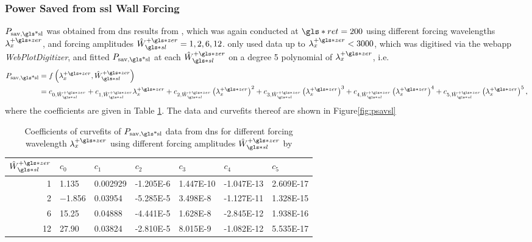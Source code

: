 \subsubsection{Power Saved from \gls{ssl} Wall Forcing}
$P_\text{sav,\gls*{sl}} $ was obtained from \gls{dns} results from \textcite{viotti2009}, which was again conducted at $\gls*{ret}=200$ using different forcing wavelengths $\lambda_x\pz$, and forcing amplitudes $\hat{W}\pz\ssl=1,2,6,12$. \textcite{chernyshenko2013} only used data up to $\lambda_x\pz<3000$, which was digitised via the webapp \textit{WebPlotDigitizer}, and fitted $P_\text{sav,\gls*{sl}}$ at each $\hat{W}\pz\ssl$ on a degree 5 polynomial of $\lambda_x\pz$, i.e.
\begin{align}
	P_\text{sav,\gls*{sl}} &= f\left(\lambda_x\pz,\hat{W}\pz\ssl\right)\\
			       &= c_{0,\hat{W}\pz\ssl} + c_{1,\hat{W}\pz\ssl}\lambda_x\pz+c_{2,\hat{W}\pz\ssl}\left(\lambda_x\pz\right)^{2}+c_{3,\hat{W}\pz\ssl}\left(\lambda_x\pz\right)^{3}+c_{4,\hat{W}\pz\ssl}\left(\lambda_x\pz\right)^{4}+c_{5,\hat{W}\pz\ssl}\left(\lambda_x\pz\right)^{5}\label{eq:psavsl}
,\end{align}
where the coefficients are given in Table \ref{tab:psavslcoeff}. The data and curvefits thereof are shown in Figure\ref{fig:psavsl}
\begin{table}[htbp]
	\centering
	\begin{tabular}{r|llllll}
		$\hat{W}\pz\ssl$ & $c_0$ & $c_1$ & $c_2$ & $c_3$ & $c_4$ & $c_5$\\
		\hline
		1 & \num{1.135} &  \num{0.002929} &  \num{-1.205E-6} &  \num{1.447E-10} &  \num{-1.047E-13} &  \num{2.609E-17}\\
		2 & \num{-1.856} &  \num{0.03954} &  \num{-5.285E-5} &  \num{3.498E-8} &  \num{-1.127E-11} &  \num{1.328E-15}\\
		6 & \num{15.25} &  \num{0.04888} &  \num{-4.441E-5} &  \num{1.628E-8} &  \num{-2.845E-12} &  \num{1.938E-16}\\
		12 & \num{27.90} &  \num{0.03824} &  \num{-2.810E-5} &  \num{8.015E-9} &  \num{-1.082E-12} &  \num{5.535E-17}
	\end{tabular}
	\caption[Coefficients of curvefits of $P_\text{sav,\gls*{sl}} $]{Coefficients of curvefits of $P_\text{sav,\gls*{sl}} $ data from \gls{dns} for different forcing wavelength $\lambda_x\pz$ using different forcing amplitudes $\hat{W}\pz\ssl$ by \textcite{viotti2009}}
	\label{tab:psavslcoeff}
\end{table}

